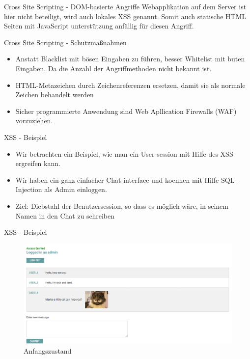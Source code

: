 \documentclass[10pt]{beamer}
\begin{document}
\begin{frame}[fragile]{Cross Site Scripting - DOM-basierte Angriffe}
  Webapplikation auf dem Server ist hier nicht beteiligt, wird auch lokales XSS genannt.
  Somit auch statische HTML Seiten mit JavaScript unterst\"utzung anf\"allig f\"ur diesen Angriff.
\end{frame}

\begin{frame}[fragile]{Cross Site Scripting - Schutzma{\ss}nahmen}
  \begin{itemize}
    \item Anstatt Blacklist mit b\"osen Eingaben zu f\"uhren, besser Whitelist mit buten Eingaben. Da die Anzahl der Angriffmethoden nicht bekannt ist.
    \item HTML-Metazeichen durch Zeichenreferenzen ersetzen, damit sie als normale Zeichen behandelt werden
    \item Sicher programmierte Anwendung sind Web Apllication Firewalls (WAF) vorzuziehen.
  \end{itemize}
\end{frame}

\begin{frame}[fragile]{XSS - Beispiel}
  \begin{itemize}
    \item Wir betrachten ein Beispiel, wie man ein User-session mit Hilfe des XSS ergreifen kann. 
    \item Wir haben ein ganz einfacher Chat-interface und koennen mit Hilfe SQL-Injection als Admin einloggen.
    \item Ziel: Diebstahl der Benutzersession, so dass es m\"oglich w\"are, in seinem Namen in den Chat zu schreiben 
  \end{itemize}
\end{frame}


\begin{frame}[fragile]{XSS - Beispiel}
  \begin{figure}[ht]
      \centering
      \includegraphics[width=\textwidth]{XSS-1.png}
      \caption{Anfangszustand}
      \label{fig:figure1}
  \end{figure}
\end{frame}
\end{document}
